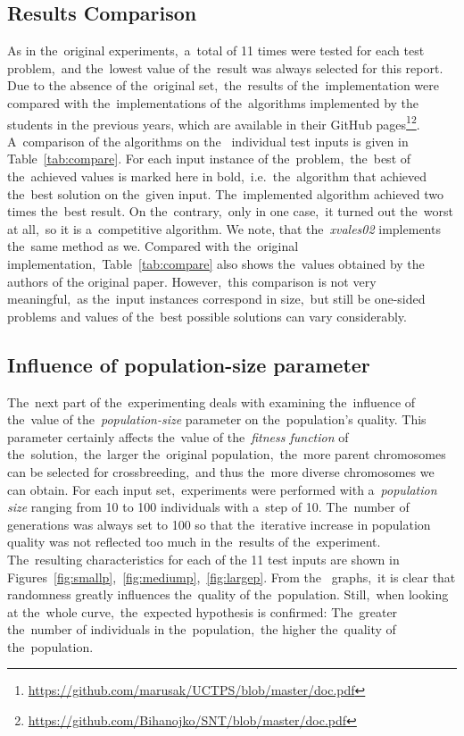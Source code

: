 \subsection{Results Comparison}
As in the~original experiments,~a~total of 11 times were tested for each test problem,~and the~lowest value of the~result was always selected for this report.
Due to the absence of the~original set,~the~results of the~implementation were compared with the~implementations of the~algorithms implemented by the students in the previous years, which are available in their GitHub pages\footnote{\url{https://github.com/marusak/UCTPS/blob/master/doc.pdf}}\footnote{\url{https://github.com/Bihanojko/SNT/blob/master/doc.pdf}}.
A~comparison of the algorithms on the~
individual test inputs is given in Table~\ref{tab:compare}.
For each input instance of the~problem,~the~best of the~achieved values is marked here in bold,~i.e.~the~algorithm that achieved the~best solution on the~given input.
The~implemented algorithm achieved two times the~best result. 
On the~contrary,~only in one case,~it turned out the~worst at all,~so it is a~competitive algorithm.
We note, that the~\textit{xvales02} implements the~same method as we.
Compared with the~original implementation,~Table~\ref{tab:compare} also shows the~values obtained by the authors of the original paper. 
However,~this comparison is not very meaningful,~as the~input instances correspond in size,~but still be one-sided problems and values of the~best possible solutions can vary considerably.

\subsection{Influence of population-size parameter}
The~next part of the~experimenting deals with examining the~influence of the~value of the~\textit{population-size} parameter on the~population's quality.
This parameter certainly affects the~value of the~\textit{fitness function} of the~solution,~the~larger the~original population,~the~more parent chromosomes can be selected for crossbreeding,~and thus the~more diverse chromosomes we can obtain.
For each input set,~experiments were performed with a~\textit{population size} ranging from 10 to 100 individuals with a~step of 10.
The~number of generations was always set to 100 so that the~iterative increase in population quality was not reflected too much in the~results of the~experiment.
The~resulting characteristics for each of the 11 test inputs are shown in Figures~\ref{fig:smallp},~\ref{fig:mediump},~\ref{fig:largep}.
From the ~graphs,~it is clear that randomness greatly influences the~quality of the~population. 
Still,~when looking at the~whole curve,~the~expected hypothesis is confirmed: The~greater the~number of individuals in the~population,~the higher the~quality of the~population.


